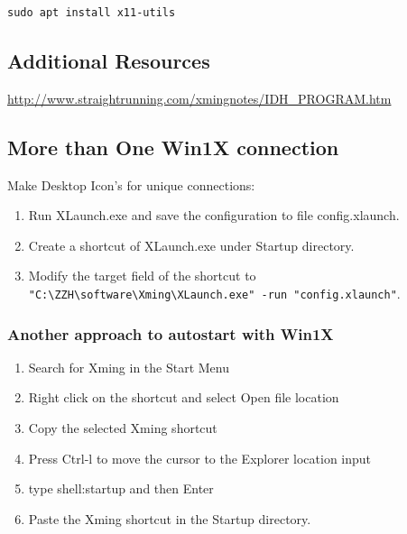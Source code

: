 \begingroup \fontsize{10pt}{10pt}
\selectfont
{\color{verbcolor}
\begin{verbatim} 
sudo apt install x11-utils
\end{verbatim}
}
\endgroup


\subsection{Additional Resources}

\url{http://www.straightrunning.com/xmingnotes/IDH_PROGRAM.htm}

\subsection{More than One Win1X connection}

Make Desktop Icon's for unique connections:


\vspace{-.15cm}
\begin{enumerate}\addtolength{\itemsep}{-0.5\baselineskip}
   \item  Run XLaunch.exe and save the configuration to file config.xlaunch.
   \item  Create a shortcut of XLaunch.exe under Startup directory.
   \item Modify the target field of the shortcut to
     \verb="C:\ZZH\software\Xming\XLaunch.exe" -run "config.xlaunch"=.
\end{enumerate}

\subsubsection{Another approach to autostart with Win1X}
\vspace{-.15cm}
\begin{enumerate}\addtolength{\itemsep}{-0.5\baselineskip}
   \item  Search for Xming in the Start Menu
   \item  Right click on the shortcut and select Open file location
   \item  Copy the selected Xming shortcut
   \item  Press Ctrl-l to move the cursor to the Explorer location input
   \item  type shell:startup and then Enter
   \item  Paste the Xming shortcut in the Startup directory.
\end{enumerate}

